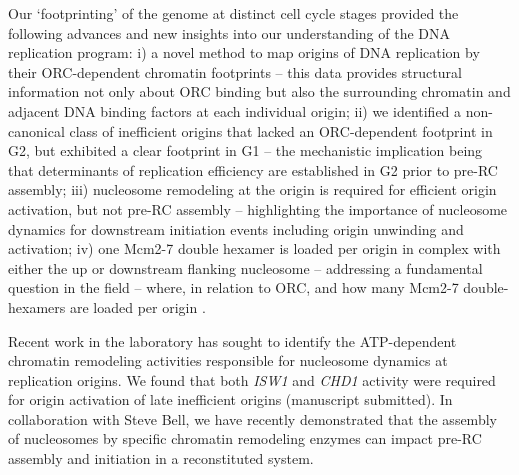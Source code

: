 Our `footprinting' of the \scer genome at distinct cell cycle stages provided the  %
following advances and new insights into our understanding of the DNA replication program: i) a novel method to map origins of DNA replication by their ORC-dependent chromatin footprints -- this data provides structural information not only about ORC binding but also the surrounding chromatin and adjacent DNA binding factors at each individual origin; ii) we identified a non-canonical class of inefficient origins that lacked an ORC-dependent footprint in G2, but exhibited a clear footprint in G1 -- the mechanistic implication being that determinants of replication efficiency are established in G2 prior to pre-RC assembly; iii) nucleosome remodeling at the origin is required for efficient origin activation, but not pre-RC assembly -- highlighting the importance of nucleosome dynamics for downstream initiation events including origin unwinding and activation; iv) one Mcm2-7 double hexamer is loaded per origin in complex with either the up or downstream flanking nucleosome -- addressing a fundamental question in the field -- where, in relation to ORC, and how many Mcm2-7 double-hexamers are loaded per origin \invivo. 






Recent work in the laboratory has sought to identify the ATP-dependent chromatin remodeling activities responsible for nucleosome dynamics at replication origins.  %
We found that both \textit{ISW1} and \textit{CHD1} activity were required for origin activation of late inefficient origins (manuscript submitted). In collaboration with Steve Bell, we have recently demonstrated that the \invitro assembly of nucleosomes by specific chromatin remodeling enzymes can impact pre-RC assembly and initiation in a reconstituted system\citep{Azmi2017-gg}.


